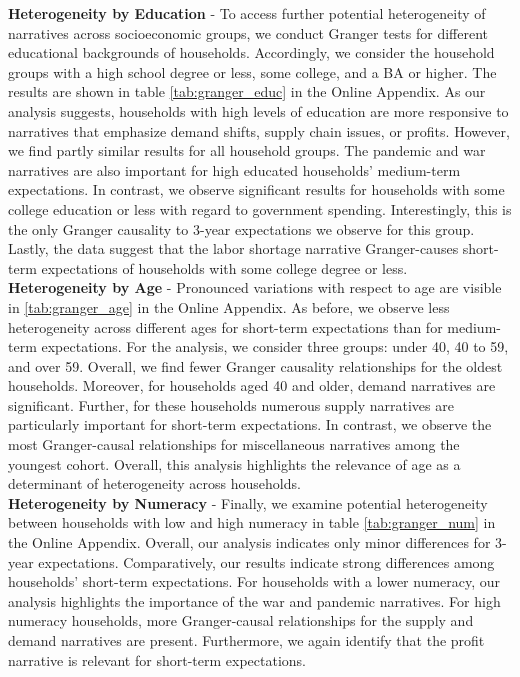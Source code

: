 \noindent \textbf{Heterogeneity by Education} - To access further potential heterogeneity of narratives across socioeconomic groups, we conduct Granger tests for different educational backgrounds of households. Accordingly, we consider the household groups with a high school degree or less, some college, and a BA or higher. The results are shown in table \ref{tab:granger_educ} in the Online Appendix. As our analysis suggests, households with high levels of education are more responsive to narratives that emphasize demand shifts, supply chain issues, or profits. However, we find partly similar results for all household groups. The pandemic and war narratives are also important for high educated households' medium-term expectations. In contrast, we observe significant results for households with some college education or less with regard to government spending. Interestingly, this is the only Granger causality to 3-year expectations we observe for this group. Lastly, the data suggest that the labor shortage narrative Granger-causes short-term expectations of households with some college degree or less.\\

\noindent \textbf{Heterogeneity by Age} - Pronounced variations with respect to age are visible in \ref{tab:granger_age} in the Online Appendix. As before, we observe less heterogeneity across different ages for short-term expectations than for medium-term expectations. For the analysis, we consider three groups: under 40, 40 to 59, and over 59. Overall, we find fewer Granger causality relationships for the oldest households. Moreover, for households aged 40 and older, demand narratives are significant. Further, for these households numerous supply narratives are particularly important for short-term expectations. In contrast, we observe the most Granger-causal relationships for miscellaneous narratives among the youngest cohort. Overall, this analysis highlights the relevance of age as a determinant of heterogeneity across households. \\

\noindent\textbf{Heterogeneity by Numeracy} - Finally, we examine potential heterogeneity between households with low and high numeracy in table \ref{tab:granger_num} in the Online Appendix. Overall, our analysis indicates only minor differences for 3-year expectations. Comparatively, our results indicate strong differences among households' short-term expectations. For households with a lower numeracy, our analysis highlights the importance of the war and pandemic narratives. For high numeracy households, more Granger-causal relationships for the supply and demand narratives are present. Furthermore, we again identify that the profit narrative is relevant for short-term expectations.

